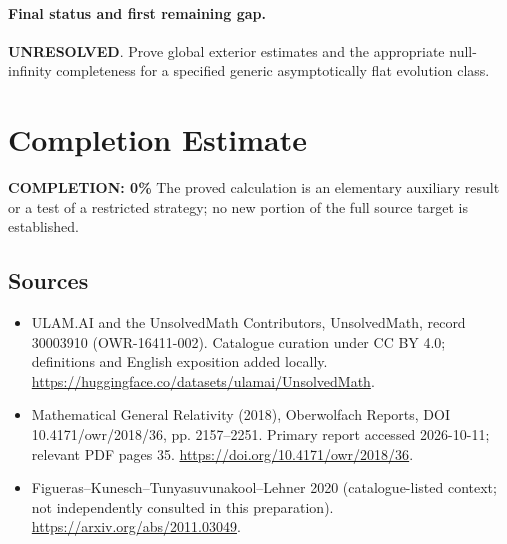 \documentclass[11pt]{article}
\begin{document}
\paragraph{Final status and first remaining gap.}
\textbf{UNRESOLVED}. Prove global exterior estimates and the appropriate null-infinity completeness for a specified generic asymptotically flat evolution class.

\section{Completion Estimate}
\noindent\textbf{COMPLETION: 0\%}
The proved calculation is an elementary auxiliary result or a test of a restricted strategy; no new portion of the full source target is established.

\subsection{Sources}
\begin{itemize}
\item[\hypertarget{source:30003910:1}{S1}] ULAM.AI and the UnsolvedMath Contributors, UnsolvedMath, record 30003910 (OWR-16411-002). Catalogue curation under CC BY 4.0; definitions and English exposition added locally.
\url{https://huggingface.co/datasets/ulamai/UnsolvedMath}.
\item[\hypertarget{source:30003910:2}{S2}] Mathematical General Relativity (2018), Oberwolfach Reports, DOI 10.4171/owr/2018/36, pp. 2157--2251. Primary report accessed 2026-10-11; relevant PDF pages 35.
\url{https://doi.org/10.4171/owr/2018/36}.
\item[\hypertarget{source:30003910:3}{S3}] Figueras--Kunesch--Tunyasuvunakool--Lehner 2020 (catalogue-listed context; not independently consulted in this preparation).
\url{https://arxiv.org/abs/2011.03049}.
\end{itemize}
\label{end:30003910}
\end{document}
